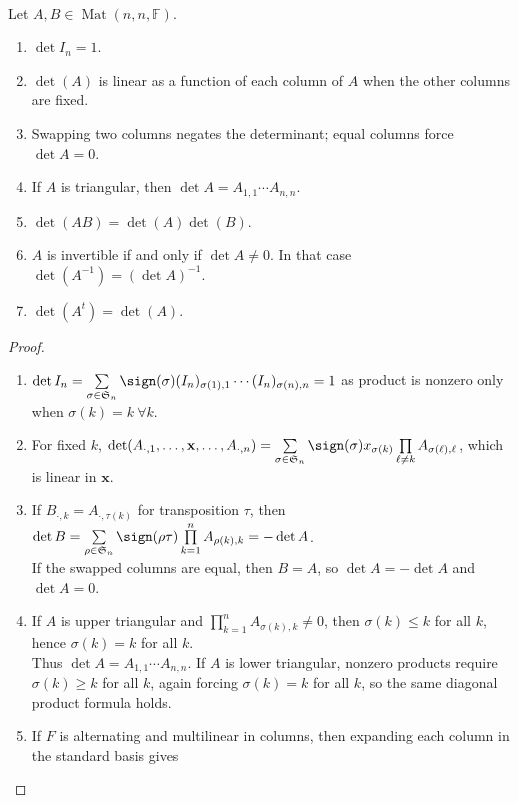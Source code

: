 \begin{theorem} \label{thm:determinant-basic-laws} \\
Let $A,B\in\operatorname{Mat}(n,n,\mathbb{F})$.
\begin{enumerate}[label=(\roman*)]
\setlength{\itemsep}{0pt}
\item $\det I_n=1$.
\item $\det(A)$ is linear as a function of each column of $A$ when the other columns are fixed.
\item Swapping two columns negates the determinant; equal columns force $\det A=0$.
\item If $A$ is triangular, then $\det A=A_{1,1}\cdots A_{n,n}$.
\item $\det(AB)=\det(A)\det(B)$.
\item $A$ is invertible if and only if $\det A\neq0$. In that case $\det(A^{-1})=(\det A)^{-1}$.
\item $\det(A^t)=\det(A)$.
\end{enumerate}
\begin{proof}
\begin{enumerate}[label=(\roman*)]
\setlength{\itemsep}{0pt}
\item $\det I_n=\sum\limits_{\sigma\in\mathfrak{S}_n}\sign(\sigma)(I_n)_{\sigma(1),1}\cdots (I_n)_{\sigma(n),n}=1$ as product is nonzero only when $\sigma(k)=k \ \forall k$.
\item For fixed $k$, $\det(A_{\cdot,1},\ldots,\mathbf{x},\ldots,A_{\cdot,n}) =\sum\limits_{\sigma\in\mathfrak{S}_n} \sign(\sigma)x_{\sigma(k)}\prod\limits_{\ell\neq k}A_{\sigma(\ell),\ell}$, which is linear in $\mathbf{x}$.
\item If $B_{\cdot,k}=A_{\cdot,\tau(k)}$ for transposition $\tau$, then $\det B=\sum\limits_{\rho\in\mathfrak{S}_n}\sign(\rho\tau)\prod\limits_{k=1}^n A_{\rho(k),k} =-\det A$.\\
If the swapped columns are equal, then $B=A$, so $\det A=-\det A$ and $\det A=0$.
\item If $A$ is upper triangular and $\prod_{k=1}^n A_{\sigma(k),k}\neq0$, then $\sigma(k)\leq k$ for all $k$, hence $\sigma(k)=k$ for all $k$.\\
Thus $\det A=A_{1,1}\cdots A_{n,n}$. If $A$ is lower triangular, nonzero products require $\sigma(k)\geq k$ for all $k$, again forcing $\sigma(k)=k$ for all $k$, so the same diagonal product formula holds.
\item If $F$ is alternating and multilinear in columns, then expanding each column in the standard basis gives\\

\end{enumerate}
\end{proof}
\end{theorem}
